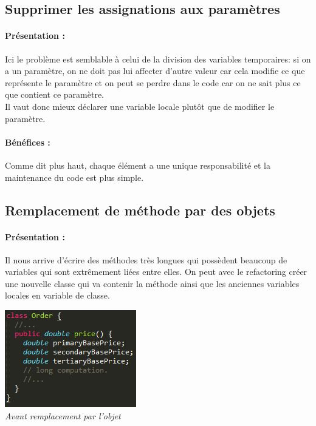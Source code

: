 \documentclass[a4paper,twoside,12pt,openright]{report}
\begin{document}
\subsection{Supprimer les assignations aux paramètres}
\paragraph{Présentation :}
Ici le problème est semblable à celui de la division des variables temporaires: si on a un paramètre, on ne doit pas lui affecter d'autre valeur car cela modifie ce que représente le paramètre et on peut se perdre dans le code car on ne sait plus ce que contient ce paramètre.\\
Il vaut donc mieux déclarer une variable locale plutôt que de modifier le paramètre.

\paragraph{Bénéfices :}
Comme dit plus haut, chaque élément a une unique responsabilité et la maintenance du code est plus simple.\\

\subsection{Remplacement de méthode par des objets}
\paragraph{Présentation :}
Il nous arrive d'écrire des méthodes très longues qui possèdent beaucoup de variables qui sont extrêmement liées entre elles. On peut avec le refactoring créer une nouvelle classe qui va contenir la méthode ainsi que les anciennes variables locales en variable de classe.

\begin{center}
\includegraphics[scale=1]{Image/MethodeToObjet.png}\\
\itshape{Avant remplacement par l'objet \cite{ref5}}
\end{center}
\end{document}
